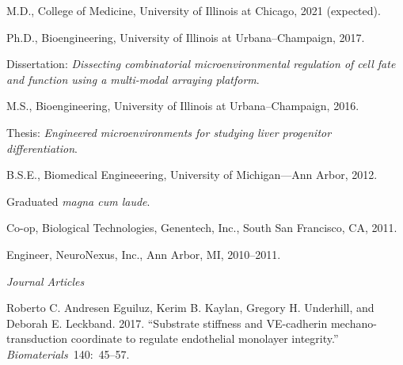 \documentclass[11pt,article,oneside]{memoir}
\begin{document}
\medskip

\reversemarginpar

\bigskip


\ind M.D., College of Medicine, University of Illinois at Chicago, 2021 (expected).

\ind Ph.D., Bioengineering, University of Illinois at Urbana--Champaign, 2017.

\ind \hspace{0.35in} \footnotesize Dissertation: \emph{Dissecting combinatorial microenvironmental regulation of cell fate and function using a multi-modal arraying platform}. \normalsize\vspace{0.05in}

\ind M.S., Bioengineering, University of Illinois at Urbana--Champaign, 2016.

\ind \hspace{0.35in} \footnotesize Thesis: \emph{Engineered microenvironments for studying liver progenitor differentiation}. \normalsize\vspace{0.05in}

\ind B.S.E., Biomedical Engineeering, University of Michigan---Ann Arbor, 2012.

\ind \hspace{0.35in} \footnotesize Graduated \emph{magna cum laude}. \normalsize\vspace{0.05in}

\bigskip
 
 
\ind Co-op, Biological Technologies, Genentech, Inc., South San Francisco, CA, 2011.
 
 \ind Engineer, NeuroNexus, Inc., Ann Arbor, MI, 2010--2011.
 
\bigskip
 

\medskip\vspace{0.20em}

\noindent\emph{Journal Articles \vspace{0.05in}}

\ind Roberto C. Andresen Eguiluz, Kerim B. Kaylan, Gregory H. Underhill, and Deborah E. Leckband. 2017. ``Substrate stiffness and VE-cadherin mechano-transduction coordinate to regulate endothelial monolayer integrity.'' \emph{Biomaterials}~140:~45--57.
\end{document}
